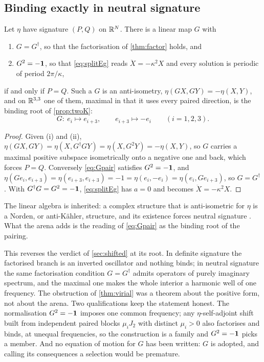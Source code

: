 \subsection{Binding exactly in neutral signature}

\begin{theorem}
\label{thm:neutral}
Let $\eta$ have signature $(P,Q)$ on $\mathbb{R}^N$. There is a linear map $G$ with
\begin{enumerate}[label=(\roman*),leftmargin=2.2em]
\item $G=G^\dagger$, so that the factorisation of \cref{thm:factor} holds, and
\item $G^2=-\mathbf 1$, so that \eqref{eq:splitEg} reads $\ddot X=-\kappa^2X$ and every solution is periodic of period $2\pi/\kappa$,
\end{enumerate}
if and only if $P=Q$. Such a $G$ is an anti-isometry, $\eta(GX,GY)=-\eta(X,Y)$, and on $\mathbb{R}^{3,3}$ one of them, maximal in that it uses every
paired direction, is the binding root of \cref{prop:twoK}:
\begin{equation}
\label{eq:Gpair}
G:\ e_i\longmapsto e_{i+3},\qquad e_{i+3}\longmapsto-e_i\qquad(i=1,2,3).
\end{equation}
\end{theorem}

\begin{proof}
Given (i) and (ii), $\eta(GX,GY)=\eta(X,G^\dagger GY)=\eta(X,G^2Y)=-\eta(X,Y)$, so $G$ carries a maximal positive subspace isometrically onto a
negative one and back, which forces $P=Q$. Conversely \eqref{eq:Gpair} satisfies $G^2=-\mathbf 1$, and
$\eta(Ge_i,e_{i+3})=\eta(e_{i+3},e_{i+3})=-1=\eta(e_i,-e_i)=\eta(e_i,Ge_{i+3})$, so $G=G^\dagger$. With $G^\dagger G=G^2=-\mathbf 1$, \eqref{eq:splitEg}
has $a=0$ and becomes $\ddot X=-\kappa^2X$.
\end{proof}

The linear algebra is inherited: a complex structure that is anti-isometric for $\eta$ is a Norden, or anti-K\"ahler, structure, and its
existence forces neutral signature \cite{BorowiecFrancavigliaVolovich00}. What the arena adds is the reading of \eqref{eq:Gpair} as the binding
root of the pairing.

This reverses the verdict of \cref{sec:shifted} at its root. In definite signature the factorised branch is an inverted oscillator and
nothing binds; in neutral signature the same factorisation condition $G=G^\dagger$ admits operators of purely imaginary spectrum, and the
maximal one makes the whole interior a harmonic well of one frequency. The obstruction of \cref{thm:virial} was a theorem about the
positive form, not about the arena. Two qualifications keep the statement honest. The normalisation $G^2=-\mathbf 1$ imposes one common
frequency; any $\eta$-self-adjoint shift built from independent paired blocks $\mu_iJ_2$ with distinct $\mu_i>0$ also factorises and binds, at
unequal frequencies, so the construction is a family and $G^2=-\mathbf 1$ picks a member. And no equation of motion for $G$ has been written:
$G$ is adopted, and calling its consequences a selection would be premature.

